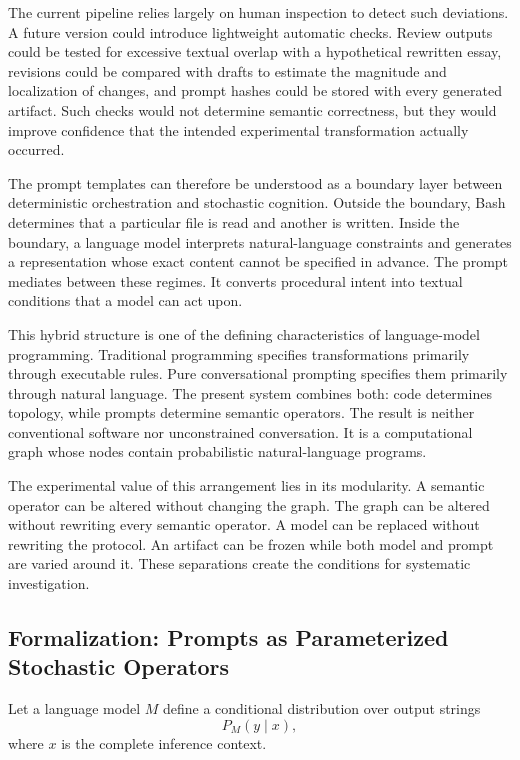 \documentclass[11pt]{article}
\begin{document}
The current pipeline relies largely on human inspection to detect such deviations. A future version could introduce lightweight automatic checks. Review outputs could be tested for excessive textual overlap with a hypothetical rewritten essay, revisions could be compared with drafts to estimate the magnitude and localization of changes, and prompt hashes could be stored with every generated artifact. Such checks would not determine semantic correctness, but they would improve confidence that the intended experimental transformation actually occurred.

The prompt templates can therefore be understood as a boundary layer between deterministic orchestration and stochastic cognition. Outside the boundary, Bash determines that a particular file is read and another is written. Inside the boundary, a language model interprets natural-language constraints and generates a representation whose exact content cannot be specified in advance. The prompt mediates between these regimes. It converts procedural intent into textual conditions that a model can act upon.

This hybrid structure is one of the defining characteristics of language-model programming. Traditional programming specifies transformations primarily through executable rules. Pure conversational prompting specifies them primarily through natural language. The present system combines both: code determines topology, while prompts determine semantic operators. The result is neither conventional software nor unconstrained conversation. It is a computational graph whose nodes contain probabilistic natural-language programs.

The experimental value of this arrangement lies in its modularity. A semantic operator can be altered without changing the graph. The graph can be altered without rewriting every semantic operator. A model can be replaced without rewriting the protocol. An artifact can be frozen while both model and prompt are varied around it. These separations create the conditions for systematic investigation.

\subsection{Formalization: Prompts as Parameterized Stochastic Operators}

Let a language model \(M\) define a conditional distribution over output strings
\[
    P_M(y\mid x),
\]
where \(x\) is the complete inference context.
\end{document}
